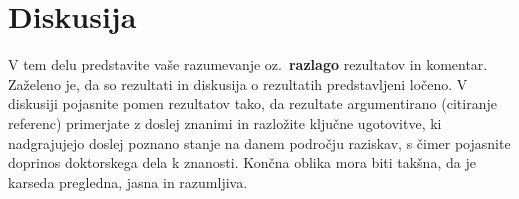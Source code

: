 \chapter{Diskusija}\label{cha:diskusija}

V tem delu predstavite vaše razumevanje oz.\ \textbf{razlago} rezultatov in komentar. Zaželeno je, da so rezultati in diskusija o rezultatih predstavljeni ločeno. V diskusiji pojasnite pomen rezultatov tako, da rezultate argumentirano (citiranje referenc) primerjate z doslej znanimi in razložite ključne ugotovitve, ki nadgrajujejo doslej poznano stanje na danem področju raziskav, s čimer pojasnite doprinos doktorskega dela k znanosti. Končna oblika mora biti takšna, da je karseda pregledna, jasna in razumljiva.